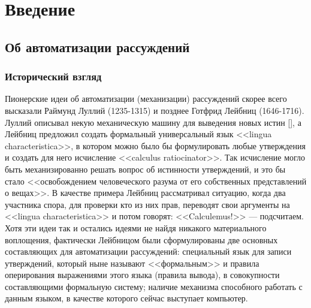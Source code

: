 \chapter{Введение}


\section{Об автоматизации рассуждений}
\subsection{Исторический взгляд}
Пионерские идеи об автоматизации (механизации) рассуждений скорее всего высказали Раймунд Луллий (1235-1315) и позднее Готфрид Лейбниц (1646-1716). Луллий описывал некую механическую машину для выведения новых истин [], а Лейбниц предложил создать формальный универсальный язык <<lingua characteristica>>, в котором можно было бы формулировать любые утверждения и создать для него исчисление <<calculus ratiocinator>>. Так исчисление могло быть механизированно решать вопрос об истинности утверждений, и это бы стало <<освобождением человеческого разума от его собственных представлений о вещах>>. В качестве примера Лейбниц рассматривал ситуацию, когда два участника спора, для проверки кто из них прав, переводят свои аргументы на <<lingua characteristica>> и потом говорят: <<Calculemus!>> --- подсчитаем. Хотя эти идеи так и остались идеями не найдя никакого материального воплощения, фактически Лейбницом были сформулированы две основных составляющих для автоматизации рассуждений: специальный язык для записи утверждений, который ныне называют <<формальным>> и правила оперирования выражениями этого языка (правила вывода), в совокупности составляющими формальную систему; наличие механизма способного работать с данным языком, в качестве которого сейчас выступает компьютер.

